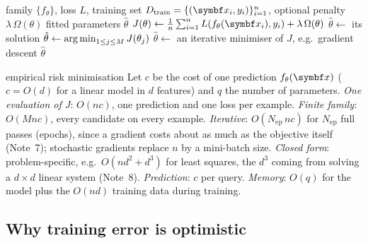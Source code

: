 \documentclass[11pt]{article}
\begin{document}
\begin{algorithm}[htbp]\small
\caption{Empirical risk minimisation (generic)}
\label{alg:erm}
\begin{algorithmic}[1]
\Require family $\{f_\theta\}$, loss $L$, training set $\Dtrain = \{(\x_i, y_i)\}_{i=1}^n$, optional penalty $\lambda\,\Omega(\theta)$
\Statex {}
\Ensure fitted parameters $\hat\theta$
  \State $J(\theta) \gets \frac1n \sum_{i=1}^n L(f_\theta(\x_i), y_i) + \lambda\,\Omega(\theta)$ 
    \State $\hat\theta \gets$ its solution 
    \State $\hat\theta \gets \operatorname*{arg\,min}_{1 \le j \le M} J(\theta_j)$ 
  \Else
    \State $\hat\theta \gets$ an iterative minimiser of $J$, e.g.\ gradient descent 
  \EndIf
  \State \Return $\hat\theta$
\EndFunction
\end{algorithmic}
\end{algorithm}

\begin{runtime}{empirical risk minimisation}
Let $c$ be the cost of one prediction $f_\theta(\x)$ ($c = O(d)$ for a linear model in $d$ features) and $q$ the
number of parameters. \emph{One evaluation of $J$}: $O(nc)$, one prediction and one loss per example. \emph{Finite
family}: $O(Mnc)$, every candidate on every example. \emph{Iterative}: $O(N_{\mathrm{ep}}\,nc)$ for $N_{\mathrm{ep}}$ full passes (epochs), since a gradient
costs about as much as the objective itself (Note~7); stochastic gradients replace $n$ by a mini-batch size.
\emph{Closed form}: problem-specific, e.g.\ $O(nd^2 + d^3)$ for least squares, the $d^3$ coming from solving a
$d \times d$ linear system (Note~8). \emph{Prediction}: $c$ per query. \emph{Memory}: $O(q)$ for the model plus the
$O(nd)$ training data during training.
\end{runtime}

\subsection{Why training error is optimistic}\label{sec:optimism}
\end{document}

